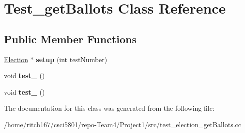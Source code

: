 \hypertarget{classTest__getBallots}{}\section{Test\+\_\+get\+Ballots Class Reference}
\label{classTest__getBallots}
\subsection*{Public Member Functions}
\begin{DoxyCompactItemize}
\item 
\mbox{\label{classTest__getBallots_a83cbce8564e6743d04ffe3223cac62df}} 
\hyperlink{classElection}{Election} $\ast$ {\bfseries setup} (int test\+Number)
\item 
\mbox{\label{classTest__getBallots_aa4041c08c7886e82a13154d272b80caf}} 
void {\bfseries test\+\_} ()
\item 
\mbox{\label{classTest__getBallots_a1ac1b55e5e62c04d2e6f11918e4ae32a}} 
void {\bfseries test\+\_} ()
\end{DoxyCompactItemize}


The documentation for this class was generated from the following file\+:\begin{DoxyCompactItemize}
\item 
/home/ritch167/csci5801/repo-\/\+Team4/\+Project1/src/test\+\_\+election\+\_\+get\+Ballots.\+cc\end{DoxyCompactItemize}
